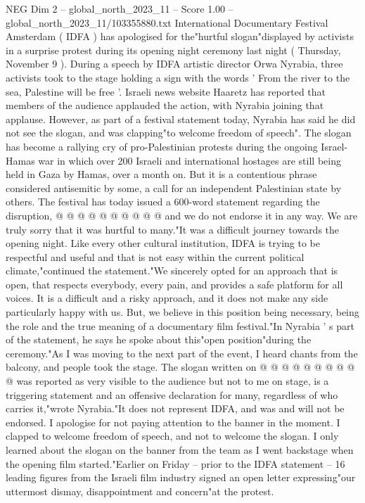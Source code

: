 \begin{textsample}{NEG Dim 2 – global\_north\_2023\_11 – Score 1.00 – global\_north\_2023\_11/103355880.txt}  \label{ex:f2_neg_210}
International Documentary Festival Amsterdam ( IDFA ) has apologised for the"hurtful slogan"displayed by activists in a surprise protest during its opening night ceremony last night ( Thursday, November 9 ).
During a speech by IDFA artistic director Orwa Nyrabia, three activists took to the stage holding a sign with the words ' From the river to the sea, Palestine will be free '.
Israeli news website Haaretz has reported that members of the audience applauded the action, with Nyrabia joining that applause.
However, as part of a festival statement today, Nyrabia has said he did not see the slogan, and was clapping"to welcome freedom of speech".
The slogan has become a rallying cry of pro-Palestinian protests during the ongoing Israel-Hamas war in which over 200 Israeli and international hostages are still being held in Gaza by Hamas, over a month on.
But it is a contentious phrase considered antisemitic by some, a call for an independent Palestinian state by others.
The festival has today issued a 600-word statement regarding the disruption, @ @ @ @ @ @ @ @ @ @ and we do not endorse it in any way.
We are truly sorry that it was hurtful to many."It was a difficult journey towards the opening night.
Like every other cultural institution, IDFA is trying to be respectful and useful and that is not easy within the current political climate,"continued the statement."We sincerely opted for an approach that is open, that respects everybody, every pain, and provides a safe platform for all voices.
It is a difficult and a risky approach, and it does not make any side particularly happy with us.
But, we believe in this position being necessary, being the role and the true meaning of a documentary film festival."In Nyrabia ' s part of the statement, he says he spoke about this"open position"during the ceremony."As I was moving to the next part of the event, I heard chants from the balcony, and people took the stage.
The slogan written on @ @ @ @ @ @ @ @ @ @ was reported as very visible to the audience but not to me on stage, is a triggering statement and an offensive declaration for many, regardless of who carries it,"wrote Nyrabia."It does not represent IDFA, and was and will not be endorsed.
I apologise for not paying attention to the banner in the moment.
I clapped to welcome freedom of speech, and not to welcome the slogan.
I only learned about the slogan on the banner from the team as I went backstage when the opening film started."Earlier on Friday -- prior to the IDFA statement -- 16 leading figures from the Israeli film industry signed an open letter expressing"our uttermost dismay, disappointment and concern"at the protest.

\end{textsample}
